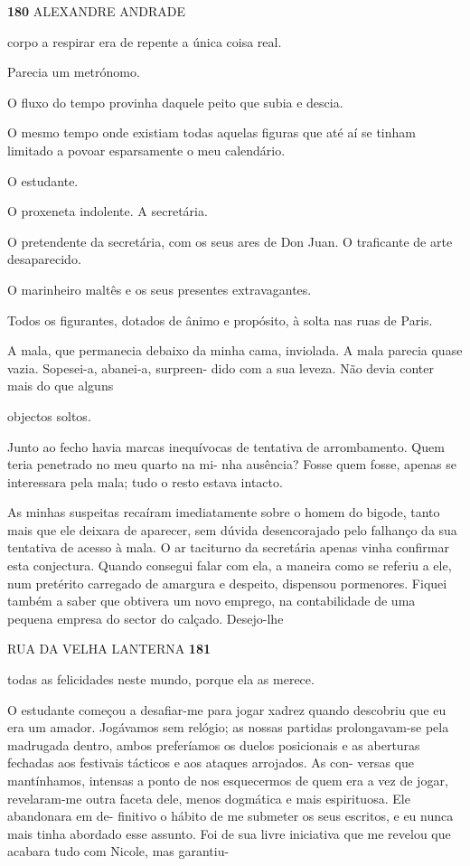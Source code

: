 \textbf{180 }ALEXANDRE ANDRADE

corpo a respirar era de repente a única coisa real.

Parecia um metrónomo.

O fluxo do tempo provinha daquele peito que subia e descia.

O mesmo tempo onde existiam todas aquelas figuras que até aí se tinham
limitado a povoar esparsamente o meu calendário.

O estudante.

O proxeneta indolente. A secretária.

O pretendente da secretária, com os seus ares de Don Juan. O traficante
de arte desaparecido.

O marinheiro maltês e os seus presentes extravagantes.

Todos os figurantes, dotados de ânimo e propósito, à solta nas ruas de
Paris.

A mala, que permanecia debaixo da minha cama, inviolada. A mala parecia
quase vazia. Sopesei-a, abanei-a, surpreen- dido com a sua leveza. Não
devia conter mais do que alguns

objectos soltos.

Junto ao fecho havia marcas inequívocas de tentativa de arrombamento.
Quem teria penetrado no meu quarto na mi- nha ausência? Fosse quem
fosse, apenas se interessara pela mala; tudo o resto estava intacto.

As minhas suspeitas recaíram imediatamente sobre o homem do bigode,
tanto mais que ele deixara de aparecer, sem dúvida desencorajado pelo
falhanço da sua tentativa de acesso à mala. O ar taciturno da secretária
apenas vinha confirmar esta conjectura. Quando consegui falar com ela, a
maneira como se referiu a ele, num pretérito carregado de amargura e
despeito, dispensou pormenores. Fiquei também a saber que obtivera um
novo emprego, na contabilidade de uma pequena empresa do sector do
calçado. Desejo-lhe

RUA DA VELHA LANTERNA \textbf{181}

todas as felicidades neste mundo, porque ela as merece.

O estudante começou a desafiar-me para jogar xadrez quando descobriu que
eu era um amador. Jogávamos sem relógio; as nossas partidas
prolongavam-se pela madrugada dentro, ambos preferíamos os duelos
posicionais e as aberturas fechadas aos festivais tácticos e aos ataques
arrojados. As con- versas que mantínhamos, intensas a ponto de nos
esquecermos de quem era a vez de jogar, revelaram-me outra faceta dele,
menos dogmática e mais espirituosa. Ele abandonara em de- finitivo o
hábito de me submeter os seus escritos, e eu nunca mais tinha abordado
esse assunto. Foi de sua livre iniciativa que me revelou que acabara
tudo com Nicole, mas garantiu-

